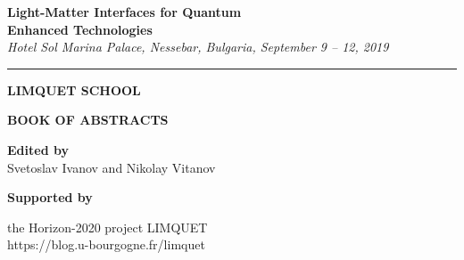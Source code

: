 \thispagestyle{empty}



\begin{center}


{\LARGE \textsf{\textbf{Light-Matter Interfaces for Quantum}\\ \vspace{2mm} \textbf{Enhanced Technologies} }}\\ \vspace{2mm}
\begingroup
    \fontsize{15pt}{12pt}\selectfont
    \emph{Hotel Sol Marina Palace, Nessebar, Bulgaria, September 9 -- 12, 2019}
\endgroup

\vspace{3mm}

\hrule

\vspace{25mm}

{\fontsize{35}{48}\selectfont \textsf{\textbf{LIMQUET SCHOOL}}}\\
\vspace{5mm}

\vspace{30mm}

{\fontsize{36}{40}\selectfont \textsf{\textbf{BOOK OF  ABSTRACTS}}}\\

\vspace{20mm}

\Large{\textbf{Edited by} \\ Svetoslav Ivanov and Nikolay Vitanov}

\vspace{55mm}

{\Large \textbf{Supported by}

the Horizon-2020 project LIMQUET\\
https://blog.u-bourgogne.fr/limquet

}




\end{center}

